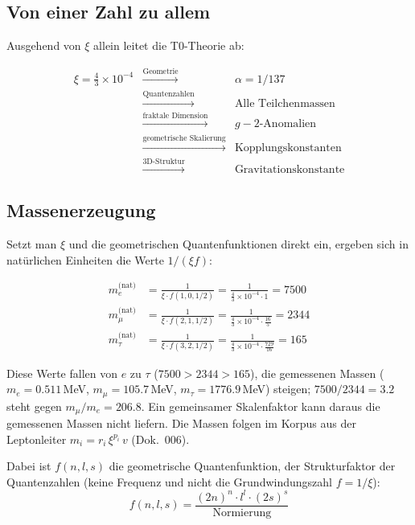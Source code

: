 	\subsection{Von einer Zahl zu allem}
	
	Ausgehend von $\xi$ allein leitet die T0-Theorie ab:
	
	\begin{equation}
		\begin{array}{rcl}
			\xi = \frac{4}{3} \times 10^{-4} & \xrightarrow{\text{Geometrie}} & \alpha = 1/137\\
			& \xrightarrow{\text{Quantenzahlen}} & \text{Alle Teilchenmassen}\\
			& \xrightarrow{\text{fraktale Dimension}} & g-2\text{-Anomalien}\\
			& \xrightarrow{\text{geometrische Skalierung}} & \text{Kopplungskonstanten}\\
			& \xrightarrow{\text{3D-Struktur}} & \text{Gravitationskonstante}
		\end{array}
	\end{equation}
	
	\subsection{Massenerzeugung}
	
	Setzt man $\xi$ und die geometrischen Quantenfunktionen direkt ein, ergeben sich in natürlichen Einheiten die Werte $1/(\xi f)$:
	
	\begin{align}
		m_e^{\text{(nat)}} &= \frac{1}{\xi \cdot f(1,0,1/2)} = \frac{1}{\frac{4}{3} \times 10^{-4} \cdot 1} = 7500 \\
		m_\mu^{\text{(nat)}} &= \frac{1}{\xi \cdot f(2,1,1/2)} = \frac{1}{\frac{4}{3} \times 10^{-4} \cdot \frac{16}{5}} = 2344 \\
		m_\tau^{\text{(nat)}} &= \frac{1}{\xi \cdot f(3,2,1/2)} = \frac{1}{\frac{4}{3} \times 10^{-4} \cdot \frac{729}{16}} = 165
	\end{align}
	
	Diese Werte fallen von $e$ zu $\tau$ ($7500 > 2344 > 165$), die gemessenen Massen ($m_e = 0.511$\,MeV, $m_\mu = 105.7$\,MeV, $m_\tau = 1776.9$\,MeV) steigen; $7500/2344 = 3.2$ steht gegen $m_\mu/m_e = 206.8$. Ein gemeinsamer Skalenfaktor kann daraus die gemessenen Massen nicht liefern. Die Massen folgen im Korpus aus der Leptonleiter $m_i = r_i\,\xi^{p_i}\,v$ (Dok.~006).
	
	Dabei ist $f(n,l,s)$ die geometrische Quantenfunktion, der Strukturfaktor der Quantenzahlen (keine Frequenz und nicht die Grundwindungszahl $f = 1/\xi$):
	\begin{equation}
		f(n,l,s) = \frac{(2n)^n \cdot l^l \cdot (2s)^s}{\text{Normierung}}
	\end{equation}
	
